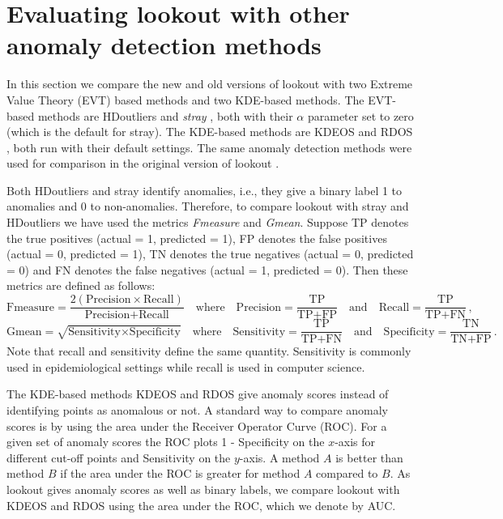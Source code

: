 \section{Evaluating lookout with other anomaly detection methods}\label{sec:compareWithOtherMethods}

In this section we compare the new and old versions of lookout with two Extreme Value Theory (EVT) based methods and two KDE-based methods. The EVT-based methods are HDoutliers \citep{wilkinson2017visualizing} and \textit{stray} \citep{talagala2019anomaly}, both with their $\alpha$ parameter set to zero (which is the default for stray). The KDE-based methods are KDEOS \citep{Schubert2014} and RDOS \citep{Tang2017}, both run with their default settings. The same anomaly detection methods were used for comparison in the original version of lookout \citep{lookout}.

Both HDoutliers and stray identify anomalies, i.e., they give a binary label 1 to anomalies and 0 to non-anomalies. Therefore, to compare lookout with stray and HDoutliers we have used the metrics \textit{Fmeasure} and \textit{Gmean}. Suppose TP denotes the true positives (actual = 1, predicted = 1), FP denotes the false positives (actual = 0, predicted = 1), TN denotes the true negatives (actual = 0, predicted = 0) and FN denotes the false negatives (actual = 1, predicted = 0). Then these metrics are defined as follows:
\[
  \text{Fmeasure} = \frac{2(\text{Precision}\times\text{Recall})}{\text{Precision} + \text{Recall}}
  \quad \text{where} \quad
  \text{Precision} = \frac{\text{TP}}{\text{TP} + \text{FP}}
  \quad \text{and} \quad
  \text{Recall} = \frac{\text{TP}}{\text{TP} + \text{FN}} \, ,
\]
\[
  \text{Gmean} = \sqrt{\text{Sensitivity} \times \text{Specificity} }
  \quad \text{where} \quad \text{Sensitivity} = \frac{\text{TP}}{\text{TP} + \text{FN}}
  \quad \text{and} \quad \text{Specificity} = \frac{\text{TN}}{\text{TN} + \text{FP}} \, .
\]
Note that recall and sensitivity define the same quantity. Sensitivity is commonly used in epidemiological settings while recall is used in computer science.

The KDE-based methods KDEOS and RDOS give anomaly scores instead of identifying points as anomalous or not. A standard way to compare anomaly scores is by using the area under the Receiver Operator Curve (ROC). For a given set of anomaly scores the ROC plots 1 - Specificity on the $x$-axis for different cut-off points and Sensitivity on the $y$-axis. A method $A$ is better than method $B$ if the area under the ROC is greater for method $A$ compared to $B$. As lookout gives anomaly scores as well as binary labels, we compare lookout with KDEOS and RDOS using the area under the ROC, which we denote by AUC.

